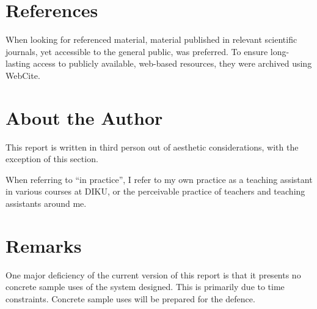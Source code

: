 \section{References}

When looking for referenced material, material published in relevant scientific
journals, yet accessible to the general public, was preferred. To ensure
long-lasting access to publicly available, web-based resources, they were
archived using WebCite\textsuperscript{\textregistered}.

\section{About the Author}

This report is written in third person out of aesthetic considerations, with
the exception of this section.

When referring to ``in practice'', I refer to my own practice as a teaching
assistant in various courses at DIKU, or the perceivable practice of teachers
and teaching assistants around me.

\section{Remarks}

One major deficiency of the current version of this report is that it presents
no concrete sample uses of the system designed. This is primarily due to time
constraints. Concrete sample uses will be prepared for the defence.
